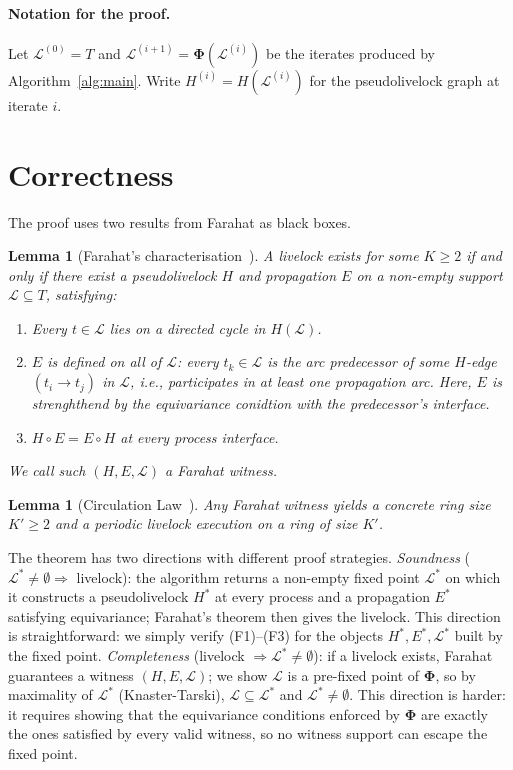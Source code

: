 \documentclass{article}
\newtheorem{lemma}[theorem]{Lemma}
\newcommand{\Ls}{\mathcal{L}^{*}}
\newcommand{\Li}[1]{\mathcal{L}^{(#1)}}   %
\newcommand{\Hi}[1]{H^{(#1)}}             %
\newcommand{\bPhi}{\boldsymbol{\Phi}}
\newcommand{\Hstar}{H^{*}}
\newcommand{\Estar}{E^{*}}
\begin{document}
\paragraph{Notation for the proof.}
Let $\Li{0}=T$ and $\Li{i+1}=\bPhi(\Li{i})$ be the iterates produced
by Algorithm~\ref{alg:main}. Write $\Hi{i}=H(\Li{i})$ for the
pseudolivelock graph at iterate $i$.

\section{Correctness}

The proof uses two results from Farahat as black boxes.

\begin{lemma}[Farahat's characterisation~{\citep[Ch.~6]{farahat2012}}]
\label{lem:farahat}
A livelock exists for some $K\!\geq\!2$ if and only if there exist a
pseudolivelock $H$ and propagation $E$ on a non-empty support
$\mathcal{L}\subseteq T$, satisfying:
\begin{enumerate}
  \item[\textbf{(F1)}] Every $t\in\mathcal{L}$ lies on a directed cycle
        in $H(\mathcal{L})$.
  \item[\textbf{(F2)}] $E$ is defined on all of $\mathcal{L}$: every
        $t_k\in\mathcal{L}$ is the arc predecessor of some $H$-edge
        $(t_i\!\to\!t_j)$ in $\mathcal{L}$, i.e., participates in at
        least one propagation arc. Here, $E$ is strenghthend by the equivariance conidtion with the predecessor's interface.
  \item[\textbf{(F3)}] $H\circ E = E\circ H$ at every process
        interface.
\end{enumerate}
We call such $(H,E,\mathcal{L})$ a \emph{Farahat witness}.
\end{lemma}

\begin{lemma}[Circulation Law~{\citep[Ch.~6]{farahat2012}}]
\label{lem:cl}
Any Farahat witness yields a concrete ring size $K'\geq 2$ and a
periodic livelock execution on a ring of size $K'$.
\end{lemma}

The theorem has two directions with different proof strategies.
\emph{Soundness} ($\Ls\neq\emptyset\Rightarrow$ livelock): the algorithm
returns a non-empty fixed point $\Ls$ on which it constructs a
pseudolivelock $\Hstar$ at every process and a propagation $\Estar$
satisfying equivariance; Farahat's theorem then gives the livelock.
This direction is straightforward: we simply verify (F1)--(F3) for the
objects $\Hstar,\Estar,\Ls$ built by the fixed point.
\emph{Completeness} (livelock $\Rightarrow\Ls\neq\emptyset$): if a
livelock exists, Farahat guarantees a witness $(H,E,\mathcal{L})$; we
show $\mathcal{L}$ is a pre-fixed point of $\bPhi$, so by maximality of
$\Ls$ (Knaster-Tarski), $\mathcal{L}\subseteq\Ls$ and $\Ls\neq\emptyset$.
This direction is harder: it requires showing that the equivariance
conditions enforced by $\bPhi$ are exactly the ones satisfied by every
valid witness, so no witness support can escape the fixed point.
\end{document}
